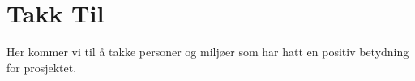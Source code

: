 \cleardoublepage
\chapter*{Takk Til}


Her kommer vi til å takke personer og miljøer som har hatt en positiv betydning for prosjektet.
